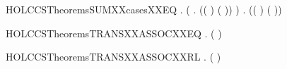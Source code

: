 \begin{SaveVerbatim}{HOLCCSTheoremsSUMXXcasesXXEQ}
\HOLTokenTurnstile{} \HOLSymConst{\HOLTokenForall{}}   .
        \HOLSymConst{+}  \HOLTokenTransBegin{}\HOLTokenTransEnd {} \HOLSymConst{\HOLTokenEquiv{}}
       (\HOLSymConst{\HOLTokenExists{}} . (( \HOLSymConst{=} ) \HOLSymConst{\HOLTokenConj{}} ( \HOLSymConst{=} )) \HOLSymConst{\HOLTokenConj{}}  \HOLTokenTransBegin{}\HOLTokenTransEnd {}) \HOLSymConst{\HOLTokenDisj{}}
       \HOLSymConst{\HOLTokenExists{}} . (( \HOLSymConst{=} ) \HOLSymConst{\HOLTokenConj{}} ( \HOLSymConst{=} )) \HOLSymConst{\HOLTokenConj{}}  \HOLTokenTransBegin{}\HOLTokenTransEnd {}
\end{SaveVerbatim}
\newcommand{\HOLCCSTheoremsSUMXXcasesXXEQ}{\UseVerbatim{HOLCCSTheoremsSUMXXcasesXXEQ}}
\begin{SaveVerbatim}{HOLCCSTheoremsTRANSXXASSOCXXEQ}
\HOLTokenTurnstile{} \HOLSymConst{\HOLTokenForall{}}    .  \HOLSymConst{+}  \HOLSymConst{+}  \HOLTokenTransBegin{}\HOLTokenTransEnd {} \HOLSymConst{\HOLTokenEquiv{}}  \HOLSymConst{+} ( \HOLSymConst{+} ) \HOLTokenTransBegin{}\HOLTokenTransEnd {}
\end{SaveVerbatim}
\newcommand{\HOLCCSTheoremsTRANSXXASSOCXXEQ}{\UseVerbatim{HOLCCSTheoremsTRANSXXASSOCXXEQ}}
\begin{SaveVerbatim}{HOLCCSTheoremsTRANSXXASSOCXXRL}
\HOLTokenTurnstile{} \HOLSymConst{\HOLTokenForall{}}    .  \HOLSymConst{+} ( \HOLSymConst{+} ) \HOLTokenTransBegin{}\HOLTokenTransEnd {} \HOLSymConst{\HOLTokenImp{}}  \HOLSymConst{+}  \HOLSymConst{+}  \HOLTokenTransBegin{}\HOLTokenTransEnd {}
\end{SaveVerbatim}

